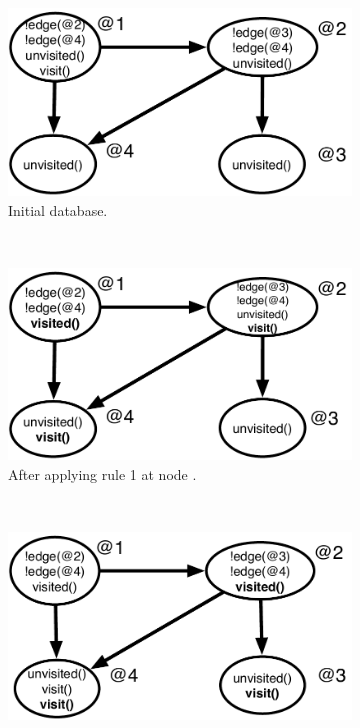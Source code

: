 \begin{figure}[h]
        \centering
        \begin{subfigure}[b]{0.45\textwidth}
                \includegraphics[width=\textwidth]{figures/visit/trace1}
                \caption{Initial database.}
                \label{fig:exec_trace1}
        \end{subfigure}%
        ~ %
        \begin{subfigure}[b]{0.45\textwidth}
                \includegraphics[width=\textwidth]{figures/visit/trace2}
                \caption{After applying rule 1 at node .}
                \label{fig:exec_trace2}
        \end{subfigure}\\
        \begin{subfigure}[b]{0.45\textwidth}
                \includegraphics[width=\textwidth]{figures/visit/trace3}

\end{subfigure}
\end{figure}
